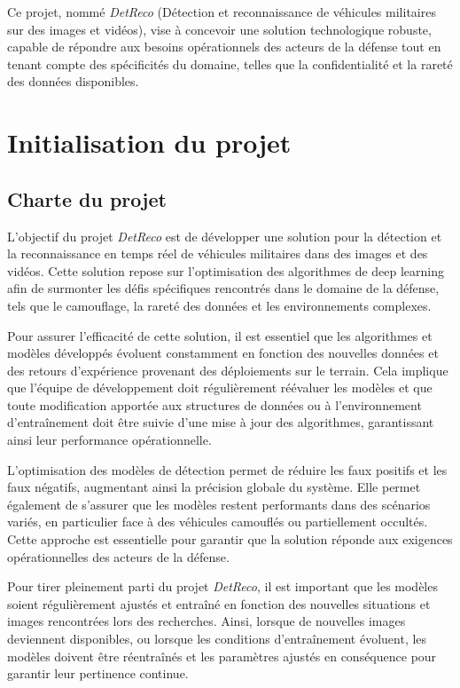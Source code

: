 Ce projet, nommé \textit{DetReco} (Détection et reconnaissance de véhicules militaires sur des images et vidéos), vise à concevoir une solution technologique robuste, capable de répondre aux besoins opérationnels des acteurs de la défense tout en tenant compte des spécificités du domaine, telles que la confidentialité et la rareté des données disponibles.


\section{Initialisation du projet}
\subsection{Charte du projet}

L’objectif du projet \textit{DetReco} est de développer une solution pour la détection et la reconnaissance en temps réel de véhicules militaires dans des images et des vidéos.
Cette solution repose sur l'optimisation des algorithmes de deep learning afin de surmonter les défis spécifiques rencontrés dans le domaine de la défense, tels que le camouflage, la rareté des données et les environnements complexes.

Pour assurer l'efficacité de cette solution, il est essentiel que les algorithmes et modèles développés évoluent constamment en fonction des nouvelles données et des retours d'expérience provenant des déploiements sur le terrain.
Cela implique que l'équipe de développement doit régulièrement réévaluer les modèles et que toute modification apportée aux structures de données ou à l'environnement d'entraînement doit être suivie d'une mise à jour des algorithmes, garantissant ainsi leur performance opérationnelle.

L’optimisation des modèles de détection permet de réduire les faux positifs et les faux négatifs, augmentant ainsi la précision globale du système.
Elle permet également de s'assurer que les modèles restent performants dans des scénarios variés, en particulier face à des véhicules camouflés ou partiellement occultés.
Cette approche est essentielle pour garantir que la solution réponde aux exigences opérationnelles des acteurs de la défense.

Pour tirer pleinement parti du projet \textit{DetReco}, il est important que les modèles soient régulièrement ajustés et entraîné en fonction des nouvelles situations et images rencontrées lors des recherches.
Ainsi, lorsque de nouvelles images deviennent disponibles, ou lorsque les conditions d'entraînement évoluent, les modèles doivent être réentraînés et les paramètres ajustés en conséquence pour garantir leur pertinence continue.



